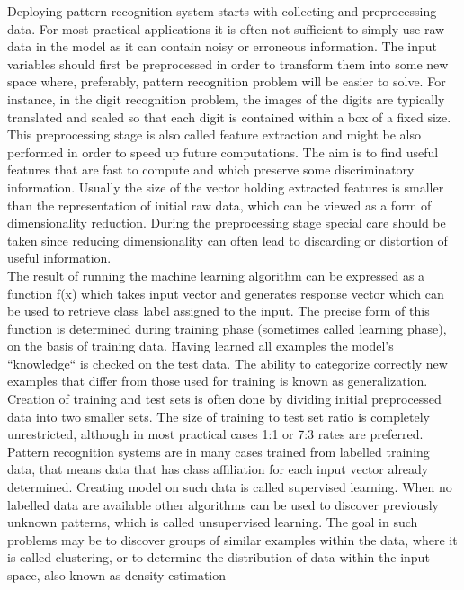 Deploying pattern recognition system starts with collecting and preprocessing data. For most practical applications it is often not sufficient to simply use raw data in the model as it can contain noisy or erroneous information. The input variables should first be preprocessed in order to transform them into some new space where, preferably, pattern recognition problem will be easier to solve. For instance, in the digit recognition problem, the images of the digits are typically translated and scaled so that each
digit is contained within a box of a fixed size. This preprocessing stage is also called feature extraction and might be also performed in order to speed up future computations. The aim is to find useful features that are fast to compute and which preserve some discriminatory information. Usually the size of the vector holding extracted features is smaller than the representation of initial raw data, which can be viewed as a form of dimensionality reduction. During the preprocessing stage special care should be taken since reducing dimensionality can often lead to discarding or distortion of useful information. \\

The result of running the machine learning algorithm can be expressed as a function f(x) which takes input vector and generates response vector which can be used to retrieve class label assigned to the input. The precise form of this function is determined during training phase (sometimes called learning phase), on the basis of training data. Having learned all examples the model's ``knowledge`` is checked on the test data. The ability to categorize correctly new examples that differ from those used for training is known as generalization. Creation of training and test sets is often done by dividing initial preprocessed data into two smaller sets. The size of training to test set ratio is completely unrestricted, although in most practical cases 1:1 or 7:3 rates are preferred. Pattern recognition systems are in many cases trained from labelled training data, that means data that has class affiliation for each input vector already determined. Creating model on such data is called supervised learning. When no labelled data are available other algorithms can be used to discover previously unknown patterns, which is called unsupervised learning. The goal in such problems may be to discover groups of similar examples within the data, where it is called clustering, or to determine the distribution of data within the input space, also known as density estimation \\